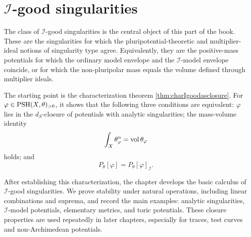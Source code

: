 \chapter{\texorpdfstring{$\mathcal{I}$}{I}-good singularities}
\label{chap:Igood}

The class of $\mathcal I$-good singularities is the central object of this part of the book. These are the singularities for which the pluripotential-theoretic and multiplier-ideal notions of singularity type agree. Equivalently, they are the positive-mass potentials for which the ordinary model envelope and the $\mathcal I$-model envelope coincide, or for which the non-pluripolar mass equals the volume defined through multiplier ideals.

The starting point is the characterization theorem \cref{thm:charIgoodasclosure}. For $\varphi\in\mathrm{PSH}(X,\theta)_{>0}$, it shows that the following three conditions are equivalent: $\varphi$ lies in the $d_S$-closure of potentials with analytic singularities; the mass-volume identity
\[
    \int_X\theta_\varphi^n=\operatorname{vol}\theta_\varphi
\]
holds; and
\[
    P_\theta[\varphi]=P_\theta[\varphi]_{\mathcal I}.
\]

After establishing this characterization, the chapter develops the basic calculus of $\mathcal I$-good singularities. We prove stability under natural operations, including linear combinations and suprema, and record the main examples: analytic singularities, $\mathcal I$-model potentials, elementary metrics, and toric potentials. These closure properties are used repeatedly in later chapters, especially for traces, test curves and non-Archimedean potentials.

